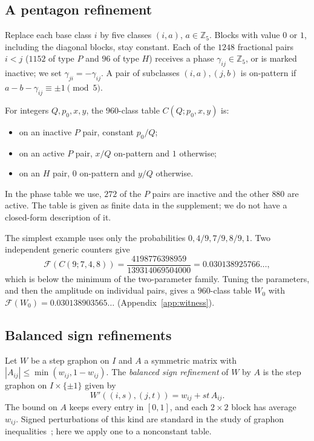 \documentclass[11pt]{article}
\theoremstyle{definition}
\theoremstyle{remark}
\newcommand{\F}{\mathcal F}
\newcommand{\Z}{\mathbb Z}
\begin{document}
\subsection{A pentagon refinement}

Replace each base class $i$ by five classes $(i,a)$, $a\in\Z_5$.
Blocks with value $0$ or $1$, including the diagonal blocks, stay constant.
Each of the $1248$ fractional pairs $i<j$ ($1152$ of type $P$ and $96$ of type $H$) receives a phase $\gamma_{ij}\in\Z_5$, or is marked inactive; we set $\gamma_{ji}=-\gamma_{ij}$.
A pair of subclasses $(i,a),(j,b)$ is on-pattern if $a-b-\gamma_{ij}\equiv\pm1\pmod5$.

For integers $Q,p_0,x,y$, the $960$-class table $C(Q;p_0,x,y)$ is:
\begin{itemize}
\item on an inactive $P$ pair, constant $p_0/Q$;
\item on an active $P$ pair, $x/Q$ on-pattern and $1$ otherwise;
\item on an $H$ pair, $0$ on-pattern and $y/Q$ otherwise.
\end{itemize}
In the phase table we use, $272$ of the $P$ pairs are inactive and the other $880$ are active.
The table is given as finite data in the supplement; we do not have a closed-form description of it.

The simplest example uses only the probabilities $0,4/9,7/9,8/9,1$.
Two independent generic counters give
\begin{equation}
\label{eq:q9}
 \F(C(9;7,4,8))=\frac{4198776398959}{139314069504000}=0.030138925766\ldots,
\end{equation}
which is below the minimum of the two-parameter family.
Tuning the parameters, and then the amplitude on individual pairs, gives a $960$-class table $W_0$ with $\F(W_0)=0.030138903565\ldots$ (Appendix~\ref{app:witness}).

\subsection{Balanced sign refinements}

Let $W$ be a step graphon on $I$ and $A$ a symmetric matrix with $|A_{ij}|\le\min(w_{ij},1-w_{ij})$.
The \emph{balanced sign refinement} of $W$ by $A$ is the step graphon on $I\times\{\pm1\}$ given by
\begin{equation}
\label{eq:sign}
 W'((i,s),(j,t))=w_{ij}+st\,A_{ij}.
\end{equation}
The bound on $A$ keeps every entry in $[0,1]$, and each $2\times2$ block has average $w_{ij}$.
Signed perturbations of this kind are standard in the study of graphon inequalities~\cite{lovasz2011,csoka2023}; here we apply one to a nonconstant table.
\end{document}

